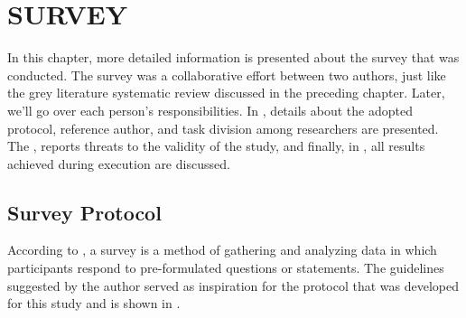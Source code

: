 \chapter{SURVEY}\label{sec:5}


In this chapter, more detailed information is presented about the survey that was conducted.
The survey was a collaborative effort between two authors, just like the grey literature systematic review discussed in the preceding chapter. Later, we'll go over each person's responsibilities.
In , details about the adopted protocol, reference author, and task division among researchers are presented.
The , reports threats to the validity of the study, and finally, in , all results achieved during execution are discussed.

\section{Survey Protocol} \label{sec:survey-protocol}


According to , a survey is a method of gathering and analyzing data in which participants respond to pre-formulated questions or statements. The guidelines suggested by the author served as inspiration for the protocol that was developed for this study and is shown in .


